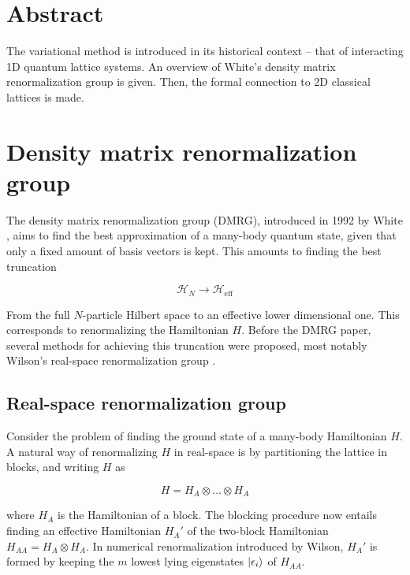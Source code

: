 \section{Abstract}

The variational method is introduced in its historical context -- that of
interacting 1D quantum lattice systems. An overview of White's density
matrix renormalization group \cite{white1992density} is given. Then, the
formal connection to 2D classical lattices is made.

\section{Density matrix renormalization group}

The density matrix renormalization group (DMRG), introduced in 1992 by
White \cite{white1992density}, aims to find the best approximation of
a many-body quantum state, given that only a fixed amount of basis vectors
is kept. This amounts to finding the best truncation

\begin{equation}
  \mathcal{H}_N \rightarrow \mathcal{H}_{\text{eff}}
\end{equation}

From the full $N$-particle Hilbert space to an effective lower dimensional
one. This corresponds to renormalizing the Hamiltonian $H$. Before the
DMRG paper, several methods for achieving this truncation were proposed,
most notably Wilson's real-space renormalization group
\cite{wilson1975renormalization}.

\subsection{Real-space renormalization group}

Consider the problem of finding the ground state of a many-body
Hamiltonian $H$. A natural way of renormalizing $H$ in real-space is by
partitioning the lattice in blocks, and writing $H$ as 

\begin{equation}
  H = H_A \otimes \ldots \otimes H_A
\end{equation}

where $H_A$ is the Hamiltonian of a block.  The blocking procedure now
entails finding an effective Hamiltonian $H_{A}'$ of the two-block
Hamiltonian $H_{AA} = H_A \otimes H_A$. In numerical renormalization
introduced by Wilson, $H_{A}'$ is formed by keeping the $m$ lowest lying
eigenstates $\ket{\epsilon_{i}}$ of $H_{AA}$.

